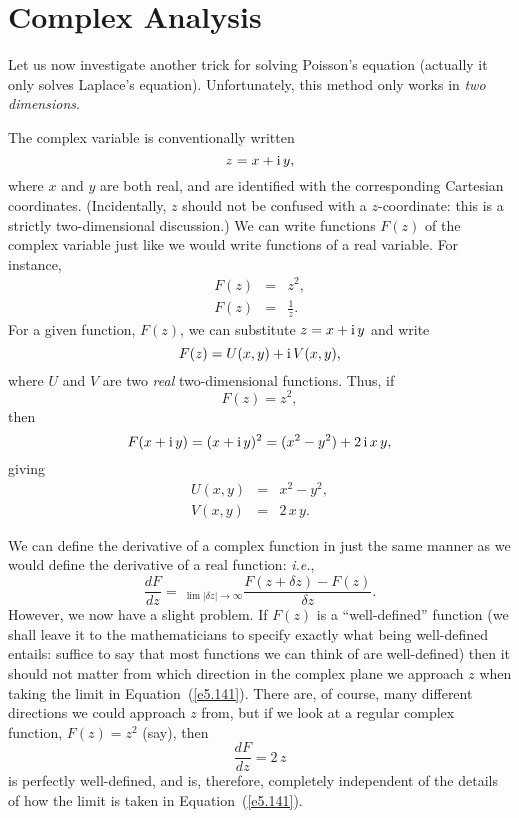 \section{Complex Analysis}
Let us now investigate another  trick for  solving Poisson's equation (actually
it only solves Laplace's equation).
Unfortunately, this method only works in {\em two dimensions}.

The complex variable is conventionally written
\begin{equation}
z = x + {\rm i}\,y,
\end{equation}
where $x$ and $y$ are both real, and are identified with the corresponding
Cartesian coordinates.
(Incidentally, $z$ should not be confused with a $z$-coordinate: this is a strictly two-dimensional discussion.) We can write functions $F(z)$ of the complex variable just like
we would write functions of a real variable. For instance,
\begin{eqnarray}
F(z) &=& z^2,\\[0.5ex]
F(z)&=& \frac{1}{z}.
\end{eqnarray}
For a given function, $F(z)$, we can substitute  $z=x +{\rm i}\,y$ and write
\begin{equation}\label{e5.137}
F(z) = U(x, y) + {\rm i}\,V(x, y),
\end{equation}
where $U$ and $V$ are two {\em real}\/ two-dimensional functions. Thus, if
\begin{equation}
F(z) = z^2,
\end{equation}
then
\begin{equation}
F(x + {\rm i}\,y) = (x+{\rm i}\,y)^2 = (x^2-y^2) + 2\,{\rm i}\, x\,y,
\end{equation}
giving
\begin{eqnarray}
U(x, y) &=& x^2 - y^2,\\[0.5ex]
V(x, y) &=& 2\, x\,y.
\end{eqnarray}

We can define the derivative of a complex function in just the same manner as
we would  define the derivative of a real function: {\em i.e.}, 
\begin{equation}\label{e5.141}
\frac{dF}{dz} = ~_{\lim |\delta z|\rightarrow\infty}
\frac{F(z+\delta z) - F(z) }{\delta z}.
\end{equation}
However, we now have a slight problem. If $F(z)$ is a ``well-defined''
function (we shall leave it to the mathematicians to specify exactly what
being well-defined entails: suffice to say that most functions we can think
of are well-defined) then it should not matter from which direction in the complex
plane we approach $z$ when taking the limit in Equation~(\ref{e5.141}).
 There are, of course, many
different directions we could approach $z$ from, but if we look at a regular complex
function, $F(z) = z^2$  (say), then
\begin{equation}
\frac{dF}{dz} = 2 \,z
\end{equation}
is perfectly well-defined, and is, therefore,  completely independent of the details of
how the limit is taken in Equation~(\ref{e5.141}).

